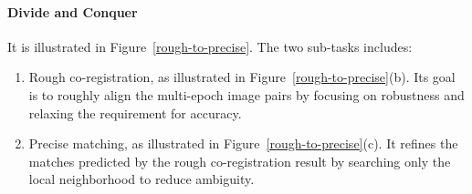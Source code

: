 \paragraph{Divide and Conquer}
 It is illustrated in Figure~\ref{rough-to-precise}. The two sub-tasks includes:\\
\begin{enumerate}
	\item Rough co-registration, as illustrated in Figure~\ref{rough-to-precise}(b). Its goal is to roughly align the multi-epoch image pairs by focusing on robustness and relaxing the requirement for accuracy.
	\item Precise matching, as illustrated in Figure~\ref{rough-to-precise}(c). It refines the matches predicted by the rough co-registration result by searching only the local neighborhood to reduce ambiguity.
\end{enumerate}
